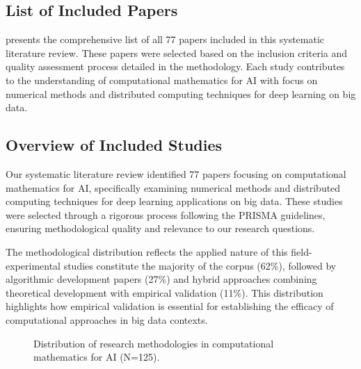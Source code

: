 \documentclass[12pt]{acm/acmart}
\begin{document}
\subsection{List of Included Papers}\label{subsec:list-of-included-papers}
 presents the comprehensive list of all 77 papers included in this systematic literature review. These papers were selected based on the inclusion criteria and quality assessment process detailed in the methodology. Each study contributes to the understanding of computational mathematics for AI with focus on numerical methods and distributed computing techniques for deep learning on big data.



\subsection{Overview of Included Studies}\label{subsec:overview-of-included-studies}
Our systematic literature review identified 77 papers focusing on computational mathematics for AI, specifically examining numerical methods and distributed computing techniques for deep learning applications on big data. These studies were selected through a rigorous process following the PRISMA guidelines, ensuring methodological quality and relevance to our research questions.

The methodological distribution reflects the applied nature of this field-experimental studies constitute the majority of the corpus (62\%), followed by algorithmic development papers (27\%) and hybrid approaches combining theoretical development with empirical validation (11\%). This distribution highlights how empirical validation is essential for establishing the efficacy of computational approaches in big data contexts.

\begin{figure}[ht]
    \centering
    \caption{Distribution of research methodologies in computational mathematics for AI (N=125).}
    \label{fig:methodology_distribution}
\end{figure}
\end{document}

